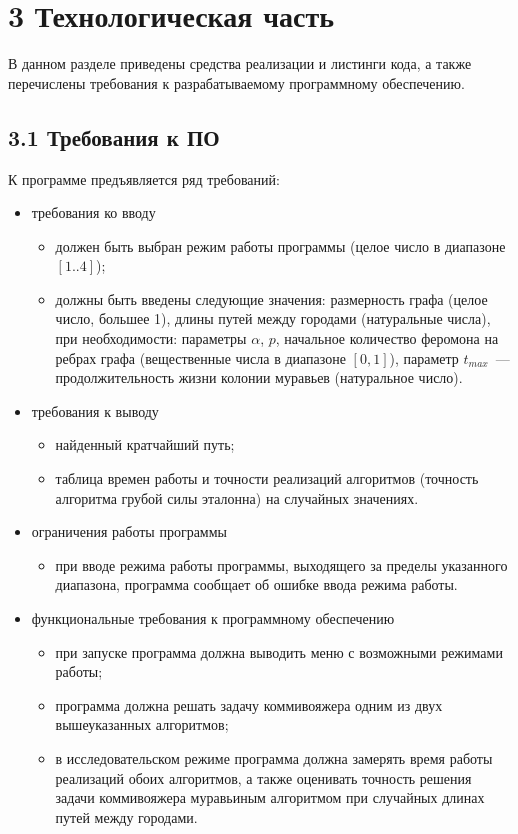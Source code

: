 \documentclass[12pt, a4paper]{report}
\begin{document}
	\chapter*{3 Технологическая часть}
	
	В данном разделе приведены средства реализации и листинги кода, а также перечислены требования к разрабатываемому программному обеспечению.
	
	\section*{3.1 Требования к ПО}
	
	К программе предъявляется ряд требований:
	
	\begin{itemize}
		\item требования ко вводу
		\begin{itemize}
			\item должен быть выбран режим работы программы (целое число в диапазоне $[1..4]$);
			\item должны быть введены следующие значения: размерность графа (целое число, большее 1), длины путей между городами (натуральные числа), при необходимости: параметры $\alpha$, $p$, начальное количество феромона на ребрах графа (вещественные числа в диапазоне $[0, 1]$), параметр $t_{max}$~--- продолжительность жизни колонии муравьев (натуральное число).
		\end{itemize}
		\item требования к выводу
		\begin{itemize}
			\item найденный кратчайший путь;
			\item таблица времен работы и точности реализаций алгоритмов (точность алгоритма грубой силы эталонна) на случайных значениях.
		\end{itemize}
		\item ограничения работы программы
		\begin{itemize}
			\item при вводе режима работы программы, выходящего за пределы указанного диапазона, программа сообщает об ошибке ввода режима работы.
		\end{itemize}
		\item функциональные требования к программному обеспечению
		\begin{itemize}
			\item при запуске программа должна выводить меню с возможными режимами работы;
			\item программа должна решать задачу коммивояжера одним из двух вышеуказанных алгоритмов;
			\item в исследовательском режиме программа должна замерять время работы реализаций обоих алгоритмов, а также оценивать точность решения задачи коммивояжера муравьиным алгоритмом при случайных длинах путей между городами.
		\end{itemize}
	\end{itemize}
	
\end{document}

